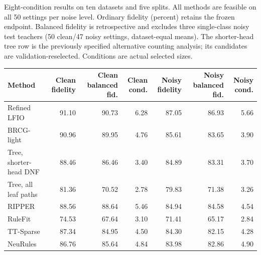 \begin{kbtable}
\centering
\caption{Eight-condition results on ten datasets and five splits. All methods are feasible on all 50 settings per noise level. Ordinary fidelity (percent) retains the frozen endpoint. Balanced fidelity is retrospective and excludes three single-class noisy test teachers (50 clean/47 noisy settings, dataset-equal means). The shorter-head tree row is the previously specified alternative counting analysis; its candidates are validation-reselected. Conditions are actual selected sizes.}
\label{tab:strength_main}
\small
\begin{adjustbox}{max width=\linewidth}
\begin{tabular}{lrrrrrr}
\toprule
Method & Clean fidelity & Clean balanced fid. & Clean cond. & Noisy fidelity & Noisy balanced fid. & Noisy cond. \\
\midrule
Refined LFIO & 91.10 & 90.73 & 6.28 & 87.05 & 86.93 & 5.66 \\
BRCG-light & 90.96 & 89.95 & 4.76 & 85.61 & 83.65 & 3.90 \\
Tree, shorter-head DNF & 88.46 & 86.46 & 3.40 & 84.89 & 83.31 & 3.70 \\
Tree, all leaf paths & 81.36 & 70.52 & 2.78 & 79.83 & 71.38 & 3.26 \\
RIPPER & 88.56 & 88.64 & 5.46 & 84.94 & 84.58 & 4.54 \\
RuleFit & 74.53 & 67.64 & 3.10 & 71.41 & 65.17 & 2.84 \\
TT-Sparse & 87.34 & 84.95 & 4.50 & 84.30 & 82.15 & 4.28 \\
NeuRules & 86.76 & 85.64 & 4.84 & 83.98 & 82.86 & 4.90 \\
\bottomrule
\end{tabular}
\end{adjustbox}
\end{kbtable}
